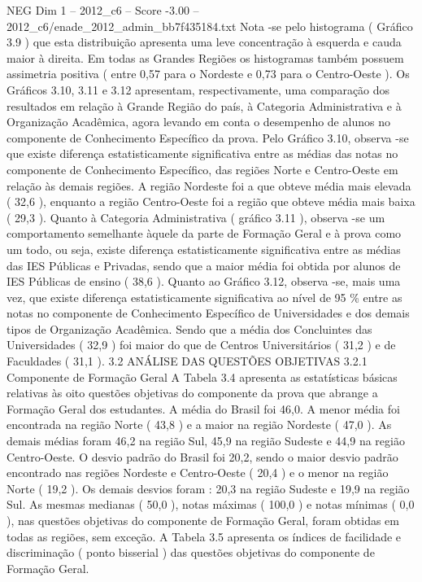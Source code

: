\begin{textsample}{NEG Dim 1 – 2012\_c6 – Score -3.00 – 2012\_c6/enade\_2012\_admin\_bb7f435184.txt}
Nota -se pelo histograma ( Gráfico 3.9 ) que esta distribuição apresenta uma leve concentração à esquerda e cauda maior à direita.
Em todas as Grandes Regiões os histogramas também possuem assimetria positiva ( entre 0,57 para o Nordeste e 0,73 para o Centro-Oeste ).
Os Gráficos 3.10, 3.11 e 3.12 apresentam, respectivamente, uma comparação dos resultados em relação à Grande Região do país, à Categoria Administrativa e à Organização Acadêmica, agora levando em conta o desempenho de alunos no componente de Conhecimento Específico da prova.
Pelo Gráfico 3.10, observa -se que existe diferença estatisticamente significativa entre as médias das notas no componente de Conhecimento Específico, das regiões Norte e Centro-Oeste em relação às demais regiões.
A região Nordeste foi a que obteve média mais elevada ( 32,6 ), enquanto a região Centro-Oeste foi a região que obteve média mais baixa ( 29,3 ).
Quanto à Categoria Administrativa ( gráfico 3.11 ), observa -se um comportamento semelhante àquele da parte de Formação Geral e à prova como um todo, ou seja, existe diferença estatisticamente significativa entre as médias das IES Públicas e Privadas, sendo que a maior média foi obtida por alunos de IES Públicas de ensino ( 38,6 ).
Quanto ao Gráfico 3.12, observa -se, mais uma vez, que existe diferença estatisticamente significativa ao nível de 95 \% entre as notas no componente de Conhecimento Específico de Universidades e dos demais tipos de Organização Acadêmica.
Sendo que a média dos Concluintes das Universidades ( 32,9 ) foi maior do que de Centros Universitários ( 31,2 ) e de Faculdades ( 31,1 ). 3.2 ANÁLISE DAS QUESTÕES OBJETIVAS 3.2.1 Componente de Formação Geral A Tabela 3.4 apresenta as estatísticas básicas relativas às oito questões objetivas do componente da prova que abrange a Formação Geral dos estudantes.
A média do Brasil foi 46,0.
A menor média foi encontrada na região Norte ( 43,8 ) e a maior na região Nordeste ( 47,0 ).
As demais médias foram 46,2 na região Sul, 45,9 na região Sudeste e 44,9 na região Centro-Oeste.
O desvio padrão do Brasil foi 20,2, sendo o maior desvio padrão encontrado nas regiões Nordeste e Centro-Oeste ( 20,4 ) e o menor na região Norte ( 19,2 ).
Os demais desvios foram : 20,3 na região Sudeste e 19,9 na região Sul.
As mesmas medianas ( 50,0 ), notas máximas ( 100,0 ) e notas mínimas ( 0,0 ), nas questões objetivas do componente de Formação Geral, foram obtidas em todas as regiões, sem exceção.
A Tabela 3.5 apresenta os índices de facilidade e discriminação ( ponto bisserial ) das questões objetivas do componente de Formação Geral.

\end{textsample}
